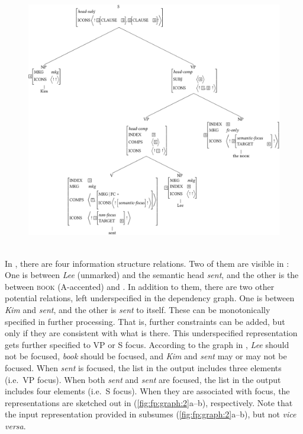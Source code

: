 \begin{figure}
      \includegraphics[width=.9\textwidth]{pdf/fp-tree.pdf}
\caption{~}
\label{fig:fp:tree}
\end{figure}




In , there are four information structure
relations. Two of them are visible in : One is
 between \textit{Lee} (unmarked) and the semantic head
\textit{sent}, and the other is the  between
\textsc{book} (A-accented) and . In
addition to them, there are two other potential relations, left
underspecified in the dependency graph.  One is between \textit{Kim}
and \textit{sent}, and the other is \textit{sent} to itself. These can
be monotonically specified in further processing. That is, further
constraints can be added, but only if they are consistent with what is
there. This underspecified  representation gets further
specified to VP  or S focus.
According to the graph in , \textit{Lee} should
not be focused, \textit{book} should be focused, and \textit{Kim} and
\textit{sent} may or may not be focused.  When \textit{sent} is
focused, the  list in the output includes three 
elements (i.e.\ VP focus). When both \textit{sent} and \textit{sent}
are focused, the  list in the output includes four
 elements (i.e.\ S focus).  When they are associated with
focus, the representations are sketched out in
(\ref{fig:fp:graph:2}a--b), respectively.  Note that the input
representation provided in  subsumes
(\ref{fig:fp:graph:2}a--b), but not \textit{vice versa}.

